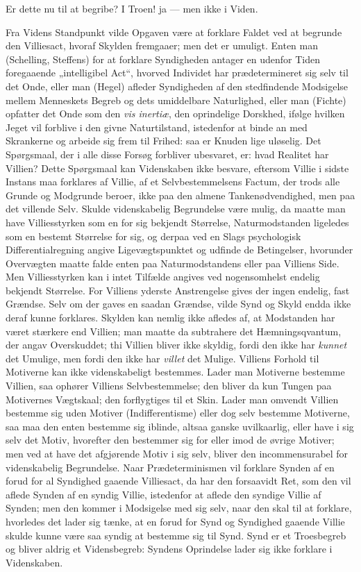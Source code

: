 \documentclass[12pt]{book}
\begin{document}
Er dette nu til at begribe? I Troen! ja --- men ikke i Viden.

Fra Videns Standpunkt vilde Opgaven være at forklare Faldet ved at
begrunde den Villiesact, hvoraf Skylden fremgaaer; men det er
umuligt. Enten man (Schelling, Steffens) for at forklare
Syndigheden antager en udenfor Tiden foregaaende „intelligibel Act“,
hvorved Individet har prædetermineret sig selv til det Onde, eller
man (Hegel) afleder Syndigheden af den stedfindende Modsigelse
mellem Menneskets Begreb og dets umiddelbare Naturlighed, eller man
(Fichte) opfatter det Onde
som den \textit{vis inertiæ}, den oprindelige Dorskhed, ifølge
hvilken Jeget vil forblive i den givne Naturtilstand, istedenfor at
binde an med Skrankerne og arbeide sig frem til Frihed: saa er
Knuden lige uløselig. Det Spørgsmaal, der i alle disse Forsøg
forbliver ubesvaret, er: hvad Realitet har Villien? Dette Spørgsmaal
kan Videnskaben ikke besvare, eftersom Villie i sidste Instans maa
forklares af Villie, af et Selvbestemmelsens Factum, der trods alle
Grunde og Modgrunde beroer, ikke paa den almene Tankenødvendighed,
men paa det villende Selv. Skulde videnskabelig Begrundelse være
mulig, da maatte man have Villiesstyrken som en for sig bekjendt
Størrelse, Naturmodstanden ligeledes som en bestemt Størrelse for
sig, og derpaa ved en Slags psychologisk Differentialregning angive
Ligevægtspunktet og udfinde de Betingelser, hvorunder Overvægten
maatte falde enten paa Naturmodstandens eller paa Villiens Side. Men
Villiesstyrken kan i intet Tilfælde angives ved nogensomhelst
endelig bekjendt Størrelse. For Villiens yderste Anstrengelse gives
der ingen endelig, fast Grændse. Selv om der gaves en saadan
Grændse, vilde Synd og Skyld endda ikke deraf kunne forklares.
Skylden kan nemlig ikke afledes af, at Modstanden har været stærkere
end Villien; man maatte da subtrahere det Hæmningsqvantum, der angav
Overskuddet; thi Villien bliver ikke skyldig, fordi den ikke har
\emph{kunnet} det Umulige, men fordi den ikke har \emph{villet} det
Mulige. Villiens Forhold til Motiverne kan ikke videnskabeligt
bestemmes. Lader man Motiverne bestemme Villien, saa ophører
Villiens Selvbestemmelse; den bliver da kun Tungen paa Motivernes
Vægtskaal; den forflygtiges til et Skin. Lader man omvendt Villien
bestemme sig uden Motiver (Indifferentisme) eller dog selv bestemme
Motiverne, saa maa den enten bestemme sig iblinde, altsaa ganske
uvilkaarlig, eller have i sig selv det Motiv, hvorefter den
bestemmer sig for eller imod
de øvrige Motiver; men ved at have det afgjørende Motiv i sig selv,
bliver den incommensurabel for videnskabelig Begrundelse. Naar
Prædeterminismen vil forklare Synden af en forud for al Syndighed
gaaende Villiesact, da har den forsaavidt Ret, som den vil aflede
Synden af en syndig Villie, istedenfor at aflede den syndige Villie
af Synden; men den kommer i Modsigelse med sig selv, naar den skal
til at forklare, hvorledes det lader sig tænke, at en forud for Synd
og Syndighed gaaende Villie skulde kunne være saa syndig at bestemme
sig til Synd. Synd er et Troesbegreb og bliver aldrig et
Vidensbegreb: Syndens Oprindelse lader sig ikke forklare i
Videnskaben.
\end{document}
